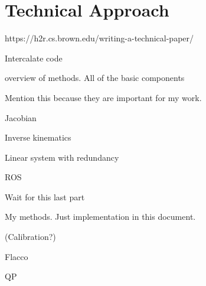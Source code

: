 \chapter{Technical Approach}
\label{techchap}


https://h2r.cs.brown.edu/writing-a-technical-paper/

Intercalate code

overview of methods. All of the basic components

Mention this because they are important for my work.

Jacobian

Inverse kinematics

Linear system with redundancy

ROS



Wait for this last part

My methods. Just implementation in this document.

(Calibration?)

Flacco

QP